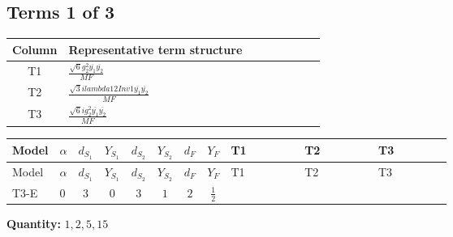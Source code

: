 \documentclass[8pt]{article}
\begin{document}
\begin{landscape}
\subsection*{Terms 1 of 3}
\begin{center}
\begin{tabular}{@{}c >{\raggedright\arraybackslash}p{0.82\linewidth}@{}}
\toprule
Column & Representative term structure \\
\midrule
T1 & \(\displaystyle \frac{\sqrt{6} g_{2}^{2} \overline{y_{1}} \overline{y_{2}}}{MF}\) \\
\midrule
T2 & \(\displaystyle \frac{\sqrt{3} i lambda12Inv1 \overline{y_{1}} \overline{y_{2}}}{MF}\) \\
\midrule
T3 & \(\displaystyle \frac{\sqrt{6} i g_{2}^{2} \overline{y_{1}} \overline{y_{2}}}{MF}\) \\
\midrule
\bottomrule
\end{tabular}
\end{center}
\smallskip
\tiny
\begin{longtable}{@{}llcccccc >{\raggedright\arraybackslash}p{0.21\linewidth} >{\raggedright\arraybackslash}p{0.21\linewidth} >{\raggedright\arraybackslash}p{0.21\linewidth}@{}}
\toprule
Model & $\alpha$ & $d_{S_1}$ & $Y_{S_1}$ & $d_{S_2}$ & $Y_{S_2}$ & $d_F$ & $Y_F$ & T1 & T2 & T3 \\
\midrule
\endfirsthead
\toprule
Model & $\alpha$ & $d_{S_1}$ & $Y_{S_1}$ & $d_{S_2}$ & $Y_{S_2}$ & $d_F$ & $Y_F$ & T1 & T2 & T3 \\
\midrule
\endhead
T3-E & $0$ & $3$ & $0$ & $3$ & $1$ & $2$ & $\frac{1}{2}$ & \scriptsize\adjustbox{max width=\linewidth}{$\begin{gathered} - \frac{\sqrt{6} g_{2}^{2} \overline{y_{1}} \overline{y_{2}}}{6 MF}\end{gathered}$} & \scriptsize\adjustbox{max width=\linewidth}{$\begin{gathered} - \frac{\sqrt{3} i lambda12Inv1 \overline{y_{1}} \overline{y_{2}}}{6 MF}\end{gathered}$} & \scriptsize\adjustbox{max width=\linewidth}{$\begin{gathered} \frac{\sqrt{6} i g_{2}^{2} \overline{y_{1}} \overline{y_{2}}}{6 MF}\end{gathered}$} \\
\midrule
\bottomrule
\end{longtable}
\clearpage
\noindent\textbf{Quantity: }$\mathrm{1,2,5,15}$\par\smallskip

\end{landscape}
\end{document}
